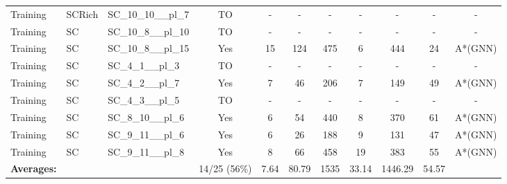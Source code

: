 \documentclass{article}
\begin{document}
\begin{tabular}{lllcccccccc}
Training & SCRich & SC\_10\_10\_\_pl\_7 & TO & - & - & - & - & - & - & - \\
Training & SC & SC\_10\_8\_\_pl\_10 & TO & - & - & - & - & - & - & - \\
Training & SC & SC\_10\_8\_\_pl\_15 & Yes & 15 & 124 & 475 & 6 & 444 & 24 & A*(GNN) \\
Training & SC & SC\_4\_1\_\_pl\_3 & TO & - & - & - & - & - & - & - \\
Training & SC & SC\_4\_2\_\_pl\_7 & Yes & 7 & 46 & 206 & 7 & 149 & 49 & A*(GNN) \\
Training & SC & SC\_4\_3\_\_pl\_5 & TO & - & - & - & - & - & - & - \\
Training & SC & SC\_8\_10\_\_pl\_6 & Yes & 6 & 54 & 440 & 8 & 370 & 61 & A*(GNN) \\
Training & SC & SC\_9\_11\_\_pl\_6 & Yes & 6 & 26 & 188 & 9 & 131 & 47 & A*(GNN) \\
Training & SC & SC\_9\_11\_\_pl\_8 & Yes & 8 & 66 & 458 & 19 & 383 & 55 & A*(GNN) \\
\textbf{Averages:} & & & 14/25 (56\%) & 7.64 & 80.79 & 1535 & 33.14 & 1446.29 & 54.57 & \\
\bottomrule
\end{tabular}
\newpage
\end{document}
